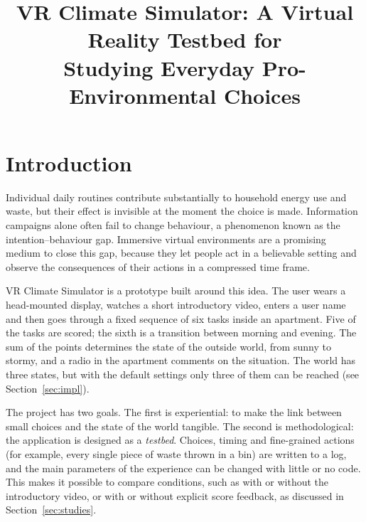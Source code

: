 \documentclass[conference]{IEEEtran}
\begin{document}
\title{VR Climate Simulator: A Virtual Reality Testbed for\\
Studying Everyday Pro-Environmental Choices}
\author{
\and
{}
}

\maketitle


\section{Introduction}
Individual daily routines contribute substantially to household energy use and
waste, but their effect is invisible at the moment the choice is made.
Information campaigns alone often fail to change behaviour, a phenomenon known
as the intention--behaviour gap. Immersive virtual
environments are a promising medium to close this gap, because they let people
act in a believable setting and observe the consequences of their actions in a
compressed time frame.

VR Climate Simulator is a prototype built around this idea. The user wears a
head-mounted display, watches a short introductory video,
enters a user name  and then goes through a fixed
sequence of six tasks inside an apartment. Five of the tasks are scored; the
sixth is a transition between morning and evening. The sum of the points
determines the state of the outside world, from sunny to stormy, and a
radio in the apartment comments on the situation. The world has three states,
but with the default settings only three of them can be reached (see
Section~\ref{sec:impl}).

The project has two goals. The first is experiential: to make the link
between small choices and the state of the world tangible. The second is
methodological: the application is designed as a \emph{testbed}. Choices,
timing and fine-grained actions (for example, every single piece of waste
thrown in a bin) are written to a log, and the main parameters of the
experience can be changed with little or no code. This makes it possible to
compare conditions, such as with or without the introductory video, or with
or without explicit score feedback, as discussed in
Section~\ref{sec:studies}.
\end{document}
